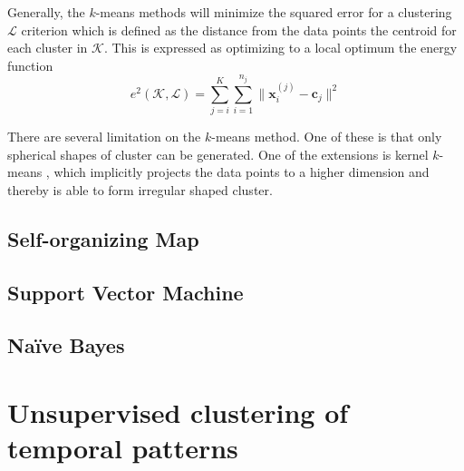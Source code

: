 Generally, the $k$-means methods will minimize the squared error for a 
clustering $\mathcal{L}$ criterion which is defined as the distance from the 
data points the centroid for each cluster in $\mathcal{K}$. This is expressed 
as optimizing to a local optimum the energy function
\begin{equation} \label{eq:k-means energy}
e^2(\mathcal{K},\mathcal{L}) = 
\sum_{j=i}^{K}\sum_{i=1}^{n_j}\|\mathbf{x}_i^{(j)} - 
\mathbf{c}_j\|^2
\end{equation}

There are several limitation on the $k$-means method. One of these is that 
only spherical shapes of cluster can be generated. One of the extensions is 
kernel $k$-means \cite{scholkopf1998nonlinear}, which implicitly projects the 
data points to a higher dimension and thereby is able to form irregular shaped 
cluster.

\subsection{Self-organizing Map}

\subsection{Support Vector Machine}

\subsection{Na\"{i}ve Bayes}

\section{Unsupervised clustering of temporal patterns}